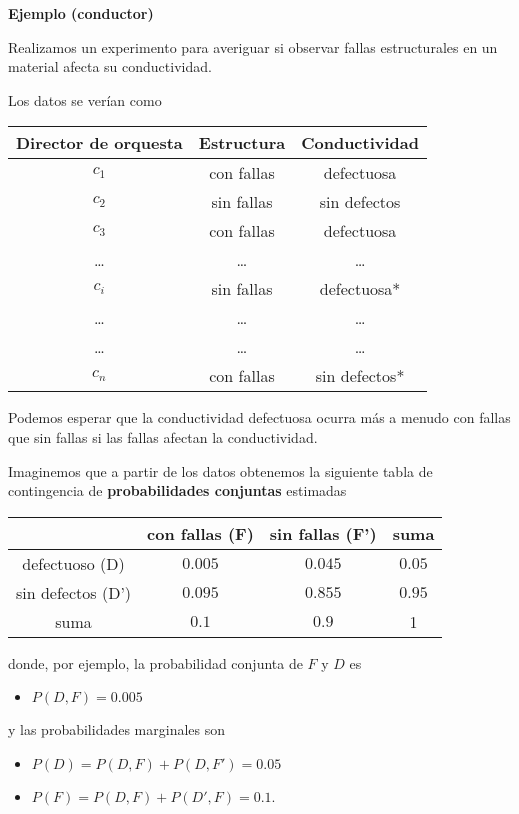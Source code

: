 \documentclass[
]{book}
\providecommand{\tightlist}{%
  \setlength{\itemsep}{0pt}\setlength{\parskip}{0pt}}
\begin{document}
\textbf{Ejemplo (conductor)}

Realizamos un experimento para averiguar si observar fallas estructurales en un material afecta su conductividad.

Los datos se verían como

\begin{longtable}[]{@{}ccc@{}}
\toprule
Director de orquesta & Estructura & Conductividad \\
\midrule
\endhead
\(c_1\) & con fallas & defectuosa \\
\(c_2\) & sin fallas & sin defectos \\
\(c_3\) & con fallas & defectuosa \\
\ldots{} & \ldots{} & \ldots{} \\
\(c_i\) & sin fallas & defectuosa* \\
\ldots{} & \ldots{} & \ldots{} \\
\ldots{} & \ldots{} & \ldots{} \\
\(c_n\) & con fallas & sin defectos* \\
\bottomrule
\end{longtable}

Podemos esperar que la conductividad defectuosa ocurra más a menudo con fallas que sin fallas si las fallas afectan la conductividad.

Imaginemos que a partir de los datos obtenemos la siguiente tabla de contingencia de \textbf{probabilidades conjuntas} estimadas

\begin{longtable}[]{@{}cccc@{}}
\toprule
& con fallas (F) & sin fallas (F') & suma \\
\midrule
\endhead
defectuoso (D) & \(0.005\) & \(0.045\) & \(0.05\) \\
sin defectos (D') & \(0.095\) & \(0.855\) & \(0.95\) \\
suma & \(0.1\) & \(0.9\) & 1 \\
\bottomrule
\end{longtable}

donde, por ejemplo, la probabilidad conjunta de \(F\) y \(D\) es

\begin{itemize}
\tightlist
\item
  \(P(D,F)=0.005\)
\end{itemize}

y las probabilidades marginales son

\begin{itemize}
\tightlist
\item
  \(P(D)=P(D, F) + P(D, F')=0.05\)
\item
  \(P(F)=P(D, F) + P(D', F)= 0.1\).
\end{itemize}
\end{document}
